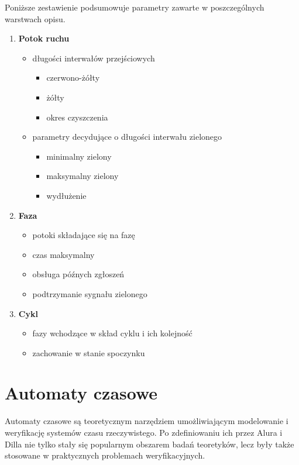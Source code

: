 \documentclass{pracamgr}
\theoremstyle{plain}
\begin{document}
Poniższe zestawienie podsumowuje parametry zawarte w poszczególnych
warstwach opisu.
\begin{enumerate}
  \item \textbf{Potok ruchu}
  \begin{itemize}
    \item długości interwałów przejściowych
    \begin{itemize}
      \item czerwono-żółty
      \item żółty
      \item okres czyszczenia
    \end{itemize}
    \item parametry decydujące o długości interwału zielonego
    \begin{itemize}
      \item minimalny zielony
      \item maksymalny zielony
      \item wydłużenie
    \end{itemize}
  \end{itemize}
  \item \textbf{Faza}
  \begin{itemize}
    \item potoki składające się na fazę
    \item czas maksymalny
    \item obsługa późnych zgłoszeń
    \item podtrzymanie sygnału zielonego
  \end{itemize}
  \item \textbf{Cykl}
  \begin{itemize}
    \item fazy wchodzące w skład cyklu i ich kolejność
    \item zachowanie w stanie spoczynku
  \end{itemize}
\end{enumerate}

\chapter{Automaty czasowe}
\label{c:ta}
Automaty czasowe są teoretycznym narzędziem umożliwiającym modelowanie
i weryfikację systemów czasu rzeczywistego. Po zdefiniowaniu ich przez
Alura i Dilla \cite{alur-dill} nie tylko stały się popularnym obszarem
badań teoretyków, lecz były także stosowane w praktycznych problemach
weryfikacyjnych.
\end{document}
